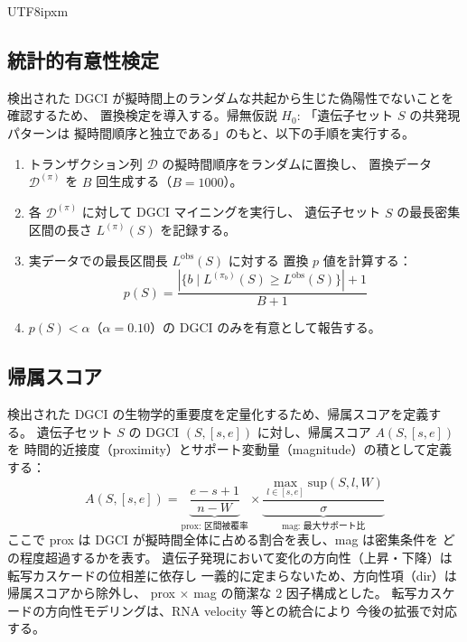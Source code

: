 \documentclass[11pt,a4paper]{article}
\begin{document}
\begin{CJK}{UTF8}{ipxm}
\subsection{統計的有意性検定}
\label{sec:permutation}

検出された DGCI が擬時間上のランダムな共起から生じた偽陽性でないことを確認するため、
置換検定を導入する。帰無仮説 $H_0$: 「遺伝子セット $S$ の共発現パターンは
擬時間順序と独立である」のもと、以下の手順を実行する。

\begin{enumerate}
  \item トランザクション列 $\mathcal{D}$ の擬時間順序をランダムに置換し、
        置換データ $\mathcal{D}^{(\pi)}$ を $B$ 回生成する（$B = 1000$）。
  \item 各 $\mathcal{D}^{(\pi)}$ に対して DGCI マイニングを実行し、
        遺伝子セット $S$ の最長密集区間の長さ $L^{(\pi)}(S)$ を記録する。
  \item 実データでの最長区間長 $L^{\mathrm{obs}}(S)$ に対する
        置換 $p$ 値を計算する：
        \begin{equation}
          p(S) = \frac{|\{b \mid L^{(\pi_b)}(S) \geq L^{\mathrm{obs}}(S)\}| + 1}{B + 1}
        \end{equation}
  \item $p(S) < \alpha$（$\alpha = 0.10$）の DGCI のみを有意として報告する。
\end{enumerate}

\subsection{帰属スコア}
\label{sec:attribution}

検出された DGCI の生物学的重要度を定量化するため、帰属スコアを定義する。
遺伝子セット $S$ の DGCI $(S, [s, e])$ に対し、帰属スコア $A(S, [s, e])$ を
時間的近接度（proximity）とサポート変動量（magnitude）の積として定義する：
\begin{equation}
  A(S, [s, e]) = \underbrace{\frac{e - s + 1}{n - W}}_{\text{prox: 区間被覆率}} \times
  \underbrace{\frac{\max_{l \in [s,e]} \mathrm{sup}(S, l, W)}{\sigma}}_{\text{mag: 最大サポート比}}
\end{equation}
ここで prox は DGCI が擬時間全体に占める割合を表し、mag は密集条件を
どの程度超過するかを表す。
遺伝子発現において変化の方向性（上昇・下降）は転写カスケードの位相差に依存し
一義的に定まらないため、方向性項（dir）は帰属スコアから除外し、
prox $\times$ mag の簡潔な 2 因子構成とした。
転写カスケードの方向性モデリングは、RNA velocity 等との統合により
今後の拡張で対応する。


\end{CJK}
\end{document}
